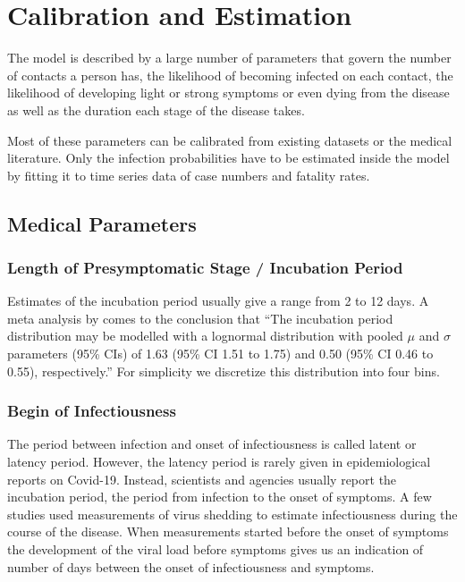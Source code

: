 \section{Calibration and Estimation}
\label{sec:calibration}

The model is described by a large number of parameters that govern the number of contacts a person has, the likelihood of becoming infected on each contact, the likelihood of developing light or strong symptoms or even dying from the disease as well as the duration each stage of the disease takes.

Most of these parameters can be calibrated from existing datasets or the medical literature. Only the infection probabilities have to be estimated inside the model by fitting it to time series data of case numbers and fatality rates.


\subsection{Medical Parameters}

\subsubsection{Length of Presymptomatic Stage / Incubation Period}


Estimates of the incubation period usually give a range from 2 to 12 days. A meta analysis by \cite{McAloon2020} comes to the conclusion that ``The incubation period distribution may be modelled with a lognormal distribution with pooled $\mu$ and $\sigma$ parameters (95\% CIs) of 1.63 (95\% CI 1.51 to 1.75) and 0.50 (95\% CI 0.46 to 0.55), respectively.'' For simplicity we discretize this distribution into four bins.


\subsubsection{Begin of Infectiousness}

The period between infection and onset of infectiousness is called latent or latency period. However, the latency period is rarely given in epidemiological reports on Covid-19. Instead, scientists and agencies usually report the incubation period, the period from infection to the onset of symptoms. A few studies used measurements of virus shedding to estimate infectiousness during the course of the disease. When measurements started before the onset of symptoms the development of the viral load before symptoms gives us an indication of number of days between the onset of infectiousness and symptoms.

